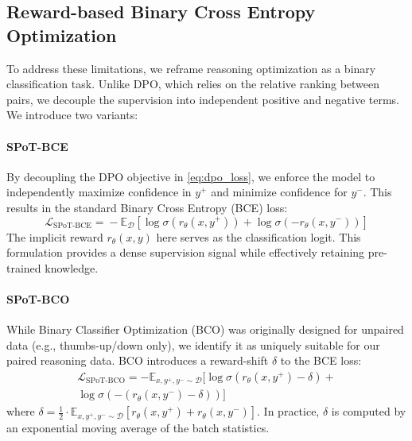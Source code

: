 \documentclass{article}
\theoremstyle{plain}
\theoremstyle{definition}
\theoremstyle{remark}
\begin{document}


\subsection{Reward-based Binary Cross Entropy Optimization}
\label{sec:method}

To address these limitations, we reframe reasoning optimization as a binary classification task. Unlike DPO, which relies on the relative ranking between pairs, we decouple the supervision into independent positive and negative terms. We introduce two variants:

\paragraph{SPoT-BCE}
By decoupling the DPO objective in \cref{eq:dpo_loss}, we enforce the model to independently maximize confidence in $y^+$ and minimize confidence for $y^-$. This results in the standard Binary Cross Entropy (BCE) loss:
\begin{equation}
    \mathcal{L}_{\text{SPoT-BCE}}\! =\! - \mathbb{E}_{\mathcal{D}} [ \log \sigma(r_\theta(x, y^+)) \!+\! \log \sigma(-r_\theta(x, y^-))]
    \label{eq:bce_loss}
\end{equation}
The implicit reward $r_\theta(x, y)$ here serves as the classification logit. This formulation provides a dense supervision signal while effectively retaining pre-trained knowledge.

\paragraph{SPoT-BCO}
While Binary Classifier Optimization (BCO) \citep{jung2025binary} was originally designed for unpaired data (e.g., thumbs-up/down only), we identify it as uniquely suitable for our paired reasoning data. BCO introduces a reward-shift $\delta$ to the BCE loss:
\begin{equation}
\begin{split}
    \mathcal{L}_{\text{SPoT-BCO}} = - \mathbb{E}_{x, y^+, y^- \sim \mathcal{D}} \big[ \log \sigma\left(r_\theta(x, y^+)\!-\!\delta\right) + \\
    \log \sigma\left(-\left(r_\theta(x, y^-)\!-\!\delta\right)\right)\big]
\end{split}
    \label{eq:bco_loss}
\end{equation}
where    $\delta=\frac{1}{2}\cdot\mathbb{E}_{x, y^+, y^- \sim \mathcal{D}}[r_\theta(x, y^+)+r_\theta(x, y^-)]$. In practice, $\delta$ is computed by an exponential moving average of the batch statistics.
\end{document}
